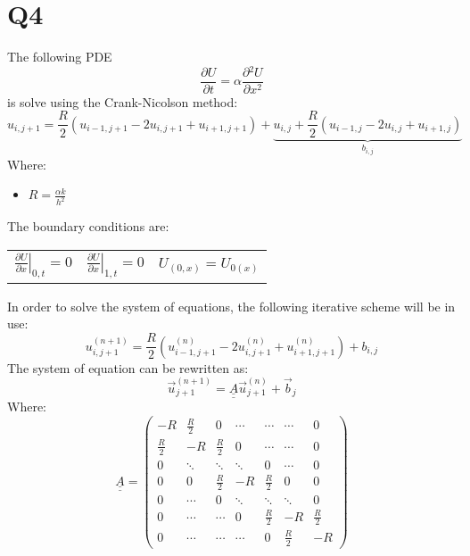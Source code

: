 \documentclass[11pt, a4paper]{article}
\newcommand{\parder}[2]{\frac{\partial {#1}}{\partial {#2}}}
\begin{document}
\section{Q4}
The following PDE
\begin{equation}
    \parder{U}{t}=\alpha\parder{^2U}{x^2}
\end{equation}
is solve using the Crank-Nicolson method:
\begin{equation}
    u_{i,j+1}=\frac{R}{2}\left(u_{i-1,j+1}-2u_{i,j+1}+u_{i+1,j+1}\right)+\underbrace{u_{i,j}+\frac{R}{2}\left(u_{i-1,j}-2u_{i,j}+u_{i+1,j}\right)}_{b_{i,j}}
\end{equation}
Where:
\begin{itemize}
    \item $\displaystyle R=\frac{\alpha k}{h^2}$
\end{itemize}
The boundary conditions are:
\begin{table}[H]
    \center
    \begin{tabular}{c||c||c}
        $\displaystyle\left.\parder{U}{x}\right|_{0,t}=0$ & $\displaystyle\left.\parder{U}{x}\right|_{1,t}=0$ & $\displaystyle U_{\left(0,x\right)}=U_{0\left(x\right)}$
    \end{tabular}
\end{table}
In order to solve the system of equations, the following iterative scheme will be in use:
\begin{equation}
    u^{\left(n+1\right)}_{i,j+1}=\frac{R}{2}\left(u^{\left(n\right)}_{i-1,j+1}-2u^{\left(n\right)}_{i,j+1}+u^{\left(n\right)}_{i+1,j+1}\right)+b_{i,j}
\end{equation}
The system of equation can be rewritten as:
\begin{equation}
    \vec{u}_{j+1}^{\left(n+1\right)}=\underline{\underline{A}}\vec{u}_{j+1}^{\left(n\right)}+\vec{b}_j
\end{equation}
Where:
\begin{equation}
    \underline{\underline{A}}=\begin{pmatrix}
        -R & \displaystyle\frac{R}{2} & 0 & \cdots & \cdots & \cdots & 0 \\
        \displaystyle\frac{R}{2} & -R & \displaystyle\frac{R}{2} & 0 & \cdots & \cdots & 0 \\
        0 & \ddots & \ddots & \ddots & 0 & \cdots & 0 \\
        0 & 0 & \displaystyle\frac{R}{2} & -R & \displaystyle\frac{R}{2} & 0 & 0 \\
        0 & \cdots & 0 & \ddots & \ddots & \ddots & 0 \\
        0 & \cdots & \cdots & 0 & \displaystyle\frac{R}{2} & -R & \displaystyle\frac{R}{2} \\
        0 & \cdots & \cdots & \cdots & 0 & \displaystyle\frac{R}{2} & -R
    \end{pmatrix}
\end{equation}
\end{document}
